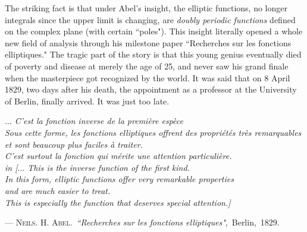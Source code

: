 The striking fact is that under Abel's insight, the elliptic functions, no longer integrals since the upper limit is changing, are {\it doubly periodic functions}\cite{stein2003complex} 
defined on the complex plane (with certain ``poles"). This insight literally opened a whole new field of analysis through his milestone paper ``Recherches sur les fonctions elliptiques." The tragic part of the story is that this young genius eventually died of poverty and disease at merely the age of 25, and never saw his grand finale when the masterpiece got recognized by the world. It was said that on 8 April 1829, two days after his death, the appointment as
a professor at the University of Berlin, finally arrived. It was just too late.    
\vfill
{\flushright
	{\sffamily\slshape
		$\ldots$ C'est la fonction inverse de la premi\`ere esp\`ece\\
		 Sous cette forme, les fonctions elliptiques offrent des propri\'et\'es tr\`es
		 remarquables\\
		 et sont beaucoup plus faciles \`a traiter.\\
		  C'est surtout la fonction qui m\'erite une attention particuli\`ere. \\
		   in
		  [$\ldots$ This is the inverse function of the first kind. \\
		  In this form, elliptic functions offer very remarkable properties\\
		   and are much easier to treat.\\
		    This is especially the function that deserves special attention.]
		  
		\medskip
		{\sffamily\upshape --- \textsc{Neils. H. Abel}.~{\it ``Recherches sur les fonctions elliptiques"},~Berlin,~1829.}
}\eject	

}
%